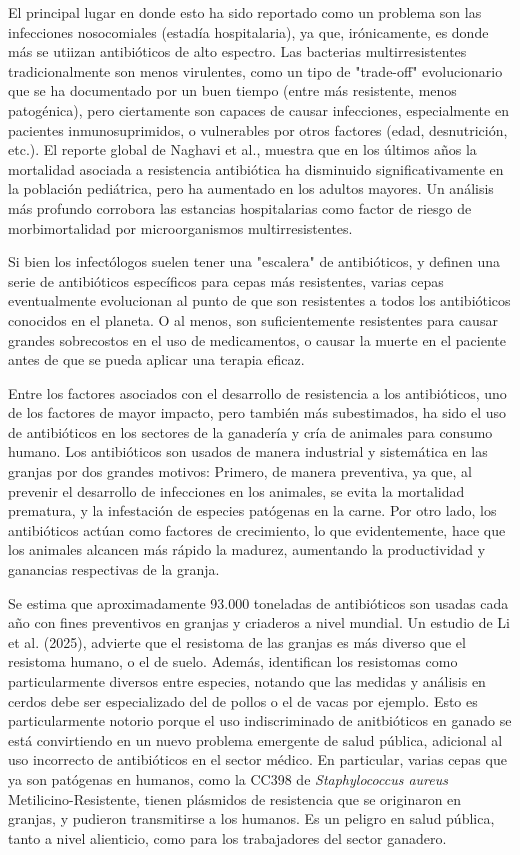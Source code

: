 \documentclass[journal]{vgtc}                     %
\begin{document}
El principal lugar en donde esto ha sido reportado como un problema son las infecciones nosocomiales (estadía hospitalaria), ya que, irónicamente, es donde más se utiizan antibióticos de alto espectro. Las bacterias multirresistentes tradicionalmente son menos virulentes, como un tipo de "trade-off" evolucionario que se ha documentado por un buen tiempo (entre más resistente, menos patogénica), pero ciertamente son capaces de causar infecciones, especialmente en pacientes inmunosuprimidos, o vulnerables por otros factores (edad, desnutrición, etc.). El reporte global de Naghavi et al., muestra que en los últimos años la mortalidad asociada a resistencia antibiótica ha disminuido significativamente en la población pediátrica, pero ha aumentado en los adultos mayores. Un análisis más profundo corrobora las estancias hospitalarias como factor de riesgo de morbimortalidad por microorganismos multirresistentes.

Si bien los infectólogos suelen tener una "escalera" de antibióticos, y definen una serie de antibióticos específicos para cepas más resistentes, varias cepas eventualmente evolucionan al punto de que son resistentes a todos los antibióticos conocidos en el planeta. O al menos, son suficientemente resistentes para causar grandes sobrecostos en el uso de medicamentos, o causar la muerte en el paciente antes de que se pueda aplicar una terapia eficaz.

Entre los factores asociados con el desarrollo de resistencia a los antibióticos, uno de los factores de mayor impacto, pero también más subestimados, ha sido el uso de antibióticos en los sectores de la ganadería y cría de animales para consumo humano. Los antibióticos son usados de manera industrial y sistemática en las granjas por dos grandes motivos: Primero, de manera preventiva, ya que, al prevenir el desarrollo de infecciones en los animales, se evita la mortalidad prematura, y la infestación de especies patógenas en la carne. Por otro lado, los antibióticos actúan como factores de crecimiento, lo que evidentemente, hace que los animales alcancen más rápido la madurez, aumentando la productividad y ganancias respectivas de la granja.

Se estima que aproximadamente 93.000 toneladas de antibióticos son usadas cada año con fines preventivos en granjas y criaderos a nivel mundial. Un estudio de Li et al. (2025), advierte que el resistoma de las granjas es más diverso que el resistoma humano, o el de suelo. Además, identifican los resistomas como particularmente diversos entre especies, notando que las medidas y análisis en cerdos debe ser especializado del de pollos o el de vacas por ejemplo. Esto es particularmente notorio porque el uso indiscriminado de anitbióticos en ganado se está convirtiendo en un nuevo problema emergente de salud pública, adicional al uso incorrecto de antibióticos en el sector médico. En particular, varias cepas que ya son patógenas en humanos, como la CC398 de \textit{Staphylococcus aureus} Metilicino-Resistente, tienen plásmidos de resistencia que se originaron en granjas, y pudieron transmitirse a los humanos. Es un peligro en salud pública, tanto a nivel alienticio, como para los trabajadores del sector ganadero.
\end{document}

